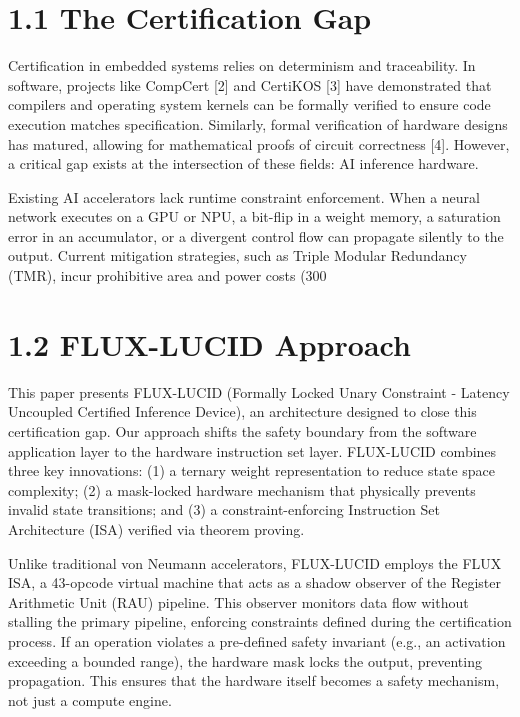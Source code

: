 \documentclass[sigplan,review,anonymous]{acmart}
\begin{document}
\section{1.1 The Certification Gap}

Certification in embedded systems relies on determinism and traceability. In software, projects like CompCert [2] and CertiKOS [3] have demonstrated that compilers and operating system kernels can be formally verified to ensure code execution matches specification. Similarly, formal verification of hardware designs has matured, allowing for mathematical proofs of circuit correctness [4]. However, a critical gap exists at the intersection of these fields: AI inference hardware.

Existing AI accelerators lack runtime constraint enforcement. When a neural network executes on a GPU or NPU, a bit-flip in a weight memory, a saturation error in an accumulator, or a divergent control flow can propagate silently to the output. Current mitigation strategies, such as Triple Modular Redundancy (TMR), incur prohibitive area and power costs (300%

\section{1.2 FLUX-LUCID Approach}

This paper presents FLUX-LUCID (Formally Locked Unary Constraint - Latency Uncoupled Certified Inference Device), an architecture designed to close this certification gap. Our approach shifts the safety boundary from the software application layer to the hardware instruction set layer. FLUX-LUCID combines three key innovations: (1) a ternary weight representation to reduce state space complexity; (2) a mask-locked hardware mechanism that physically prevents invalid state transitions; and (3) a constraint-enforcing Instruction Set Architecture (ISA) verified via theorem proving.

Unlike traditional von Neumann accelerators, FLUX-LUCID employs the FLUX ISA, a 43-opcode virtual machine that acts as a shadow observer of the Register Arithmetic Unit (RAU) pipeline. This observer monitors data flow without stalling the primary pipeline, enforcing constraints defined during the certification process. If an operation violates a pre-defined safety invariant (e.g., an activation exceeding a bounded range), the hardware mask locks the output, preventing propagation. This ensures that the hardware itself becomes a safety mechanism, not just a compute engine.
\end{document}
